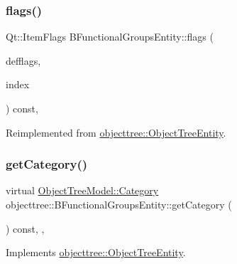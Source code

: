 \mbox{\label{classobjecttree_1_1_b_functional_groups_entity_aed532d8d49b107b7af8a57385963e94c}} 
\subsubsection{\texorpdfstring{flags()}{flags()}}
{\footnotesize\ttfamily Qt\+::\+Item\+Flags B\+Functional\+Groups\+Entity\+::flags (\begin{DoxyParamCaption}\item[{Qt\+::\+Item\+Flags}]{defflags,  }\item[{const Q\+Model\+Index \&}]{index }\end{DoxyParamCaption}) const\hspace{0.3cm}{\ttfamily [override]}, {\ttfamily [virtual]}}



Reimplemented from \mbox{\hyperlink{classobjecttree_1_1_object_tree_entity_a71042bfb5a8328bcbde9d283c0b1b28c}{objecttree\+::\+Object\+Tree\+Entity}}.

\mbox{\label{classobjecttree_1_1_b_functional_groups_entity_a0a80942b0dac5d3f7ac46af3866071ce}} 
\subsubsection{\texorpdfstring{getCategory()}{getCategory()}}
{\footnotesize\ttfamily virtual \mbox{\hyperlink{class_object_tree_model_a379e9d6b0d381853785adf62095ba4e3}{Object\+Tree\+Model\+::\+Category}} objecttree\+::\+B\+Functional\+Groups\+Entity\+::get\+Category (\begin{DoxyParamCaption}{ }\end{DoxyParamCaption}) const\hspace{0.3cm}{\ttfamily [inline]}, {\ttfamily [override]}, {\ttfamily [virtual]}}



Implements \mbox{\hyperlink{classobjecttree_1_1_object_tree_entity_aa4e80e7fa80672c1b9902add665abc77}{objecttree\+::\+Object\+Tree\+Entity}}.


